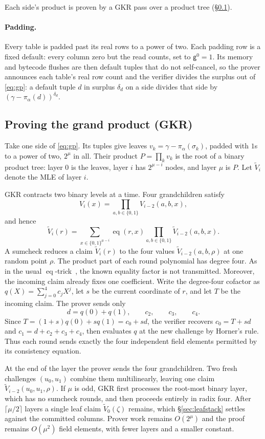 \documentclass[11pt]{article}
\newcommand{\eq}{\operatorname{eq}}
\newcommand{\cube}[1]{\{0,1\}^{#1}}
\newcommand{\gen}{\mathsf{g}}
\begin{document}
Each side's product is proven by a GKR pass over a product tree (\S\ref{sec:gkr}).

\paragraph{Padding.} Every table is padded past its real rows to a power of two. Each padding row is a fixed default: every column zero but the read counts, set to $\gen^{0}=1$. Its memory and bytecode flushes are then default tuples that do not self-cancel, so the prover announces each table's real row count and the verifier divides the surplus out of \eqref{eq:gp}: a default tuple $d$ in surplus $\delta_d$ on a side divides that side by $(\gamma-\pi_\alpha(d))^{\delta_d}$.


\subsection{Proving the grand product (GKR)}\label{sec:gkr}

Take one side of \eqref{eq:gp}. Its tuples give leaves $v_k=\gamma-\pi_\alpha(\sigma_k)$, padded with $1$s to a power of two, $2^\mu$ in all. Their product $P=\prod_kv_k$ is the root of a binary product tree: layer $0$ is the leaves, layer $i$ has $2^{\mu-i}$ nodes, and layer $\mu$ is $P$. Let $\widetilde V_i$ denote the MLE of layer $i$.

GKR contracts two binary levels at a time. Four grandchildren satisfy
\[
V_i(x)=\prod_{a,b\in\{0,1\}}V_{i-2}(a,b,x),
\]
and hence
\[
\widetilde V_i(r)=\sum_{x\in\cube{\mu-i}}\eq(r,x)\prod_{a,b\in\{0,1\}}\widetilde V_{i-2}(a,b,x).
\]
A sumcheck reduces a claim $\widetilde V_i(r)$ to the four values $\widetilde V_{i-2}(a,b,\rho)$ at one random point $\rho$. The product part of each round polynomial has degree four. As in the usual $\eq$-trick~\cite{cryptoeprint:2024/108}, the known equality factor is not transmitted. Moreover, the incoming claim already fixes one coefficient. Write the degree-four cofactor as $q(X)=\sum_{j=0}^{4}c_jX^j$, let $s$ be the current coordinate of $r$, and let $T$ be the incoming claim. The prover sends only
\[
d=q(0)+q(1),\qquad c_2,\qquad c_3,\qquad c_4.
\]
Since $T=(1+s)q(0)+sq(1)=c_0+sd$, the verifier recovers $c_0=T+sd$ and $c_1=d+c_2+c_3+c_4$, then evaluates $q$ at the new challenge by Horner's rule. Thus each round sends exactly the four independent field elements permitted by its consistency equation.

At the end of the layer the prover sends the four grandchildren. Two fresh challenges $(u_0,u_1)$ combine them multilinearly, leaving one claim $\widetilde V_{i-2}(u_0,u_1,\rho)$. If $\mu$ is odd, GKR first processes the root-most binary layer, which has no sumcheck rounds, and then proceeds entirely in radix four. After $\lceil\mu/2\rceil$ layers a single leaf claim $\widetilde V_0(\zeta)$ remains, which \S\ref{sec:leafstack} settles against the committed columns. Prover work remains $O(2^\mu)$ and the proof remains $O(\mu^2)$ field elements, with fewer layers and a smaller constant.
\end{document}
